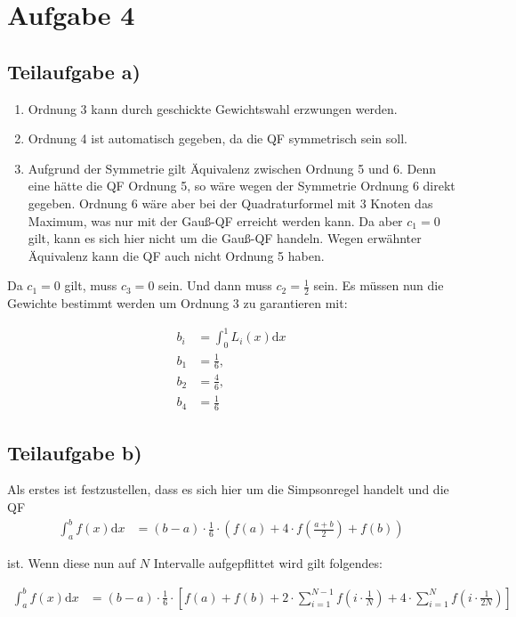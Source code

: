 \section*{Aufgabe 4}
\subsection*{Teilaufgabe a)}
\begin{enumerate}
    \item Ordnung 3 kann durch geschickte Gewichtswahl erzwungen werden.
    \item Ordnung 4 ist automatisch gegeben, da die QF symmetrisch sein soll.
    \item Aufgrund der Symmetrie gilt Äquivalenz zwischen Ordnung 5 und 6. 
          Denn eine hätte die QF Ordnung 5, so wäre wegen der 
          Symmetrie Ordnung 6 direkt gegeben. Ordnung 6 wäre aber 
          bei der Quadraturformel mit 3 Knoten das Maximum, was nur 
          mit der Gauß-QF erreicht werden kann. Da aber $c_1 = 0$ gilt, 
          kann es sich hier nicht um die Gauß-QF handeln. Wegen 
          erwähnter Äquivalenz kann die QF auch nicht Ordnung 5 haben.
\end{enumerate}

Da $c_1 = 0$ gilt, muss $c_3 = 0$ sein. Und dann muss $c_2 = \frac{1}{2}$
sein. Es müssen nun die Gewichte bestimmt werden um Ordnung 3 zu 
garantieren mit:

\begin{align}
    b_i &= \int_0^1 L_i(x) \mathrm{d}x\\
    b_1 &= \frac{1}{6},\\
    b_2 &= \frac{4}{6},\\
    b_4 &= \frac{1}{6}
\end{align}

\subsection*{Teilaufgabe b)}
Als erstes ist festzustellen, dass es sich hier um die Simpsonregel handelt und die QF
\begin{align}
    \int_a^b f(x) \mathrm{d}x &= (b-a) \cdot \frac{1}{6} \cdot \left ( f(a) + 4 \cdot f(\frac{a+b}{2}) + f(b) \right )
\end{align}

ist. Wenn diese nun auf $N$ Intervalle aufgepflittet wird gilt folgendes:

\begin{align}
    \int_a^b f(x) \mathrm{d}x &= (b-a) \cdot \frac{1}{6} \cdot \left [ f(a) + f(b) + 2 \cdot \sum_{i=1}^{N-1} f(i \cdot \frac{1}{N}) + 4 \cdot \sum_{i=1}^N f(i \cdot \frac{1}{2N})\right ]
\end{align}

